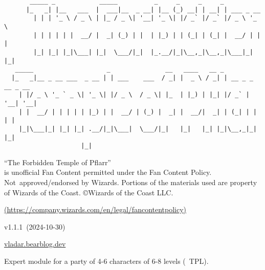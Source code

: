 \documentclass[english,11pt,openany,letterpaper,twocolumn]{book}
\def\title{The Forbidden Temple of Pflarr}
\def\license{%
	``\title''\\is unofficial Fan Content permitted under the Fan Content Policy. Not~approved/endorsed by Wizards. Portions of the materials used are property of Wizards of the Coast. ©Wizards of the Coast LLC.}
\def\licenselink{https://company.wizards.com/en/legal/fancontentpolicy}
\def\modVer{1.1.1}
\def\modDate{2024-10-30}
\begin{document}
\color{darkgray}


\begin{titlepage}

\begin{Verbatim}
       _____ _            _____          _     _     _     _                 
      |_   _| |__   ___  |  ___|__  _ __| |__ (_) __| | __| | ___ _ __       
        | | | '_ \ / _ \ | |_ / _ \| '__| '_ \| |/ _` |/ _` |/ _ \ '_ \      
        | | | | | |  __/ |  _| (_) | |  | |_) | | (_| | (_| |  __/ | | |     
        |_| |_| |_|\___| |_|  \___/|_|  |_.__/|_|\__,_|\__,_|\___|_| |_|     
   _____                    _               __   ____   __ _                 
  |_   _|__ _ __ ___  _ __ | | ___    ___  / _| |  _ \ / _| | __ _ _ __ _ __ 
    | |/ _ \ '_ ` _ \| '_ \| |/ _ \  / _ \| |_  | |_) | |_| |/ _` | '__| '__|
    | |  __/ | | | | | |_) | |  __/ | (_) |  _| |  __/|  _| | (_| | |  | |   
    |_|\___|_| |_| |_| .__/|_|\___|  \___/|_|   |_|   |_| |_|\__,_|_|  |_|   
                     |_|                                                     
\end{Verbatim}

\vfill

\noindent
\begin{minipage}{\textwidth}
	\setmonofont{TruetypewriterPolyglOTT}
	\renewcommand{\FancyVerbFormatLine}[1]{\vspace*{-0.5ex}#1}
\end{minipage}

\vfill
\vfill

\begin{tabbox}[7][7]
\centering
\license

\href{\licenselink}{(\licenselink)}

v\modVer{}~(\modDate{})

{\href{https://vladar.bearblog.dev}{vladar.bearblog.dev}}
\end{tabbox}

\end{titlepage}

\thispagestyle{empty}

\noindent
\begin{minipage}{\textwidth}
	\begin{textbox}
		\centering
		Expert module for a party of 4-6 characters of 6-8 levels (~TPL).
	\end{textbox}
\end{minipage}
\end{document}
